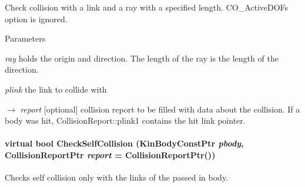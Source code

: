 Check collision with a link and a ray with a specified length. CO\_\-ActiveDOFs option is ignored. 


\begin{DoxyParams}{Parameters}
\item[{\em ray}]holds the origin and direction. The length of the ray is the length of the direction. \item[{\em plink}]the link to collide with \item[\mbox{$\rightarrow$} {\em report}]\mbox{[}optional\mbox{]} collision report to be filled with data about the collision. If a body was hit, CollisionReport::plink1 contains the hit link pointer. \end{DoxyParams}
\hypertarget{classOpenRAVE_1_1CollisionCheckerBase_a5e1f41d8d334da4d500a4cc107bfb696}{
\paragraph[{CheckSelfCollision}]{\setlength{\rightskip}{0pt plus 5cm}virtual bool CheckSelfCollision (KinBodyConstPtr {\em pbody}, \/  CollisionReportPtr {\em report} = {\ttfamily CollisionReportPtr()})}\hfill}
\label{classOpenRAVE_1_1CollisionCheckerBase_a5e1f41d8d334da4d500a4cc107bfb696}


Checks self collision only with the links of the passed in body. 

